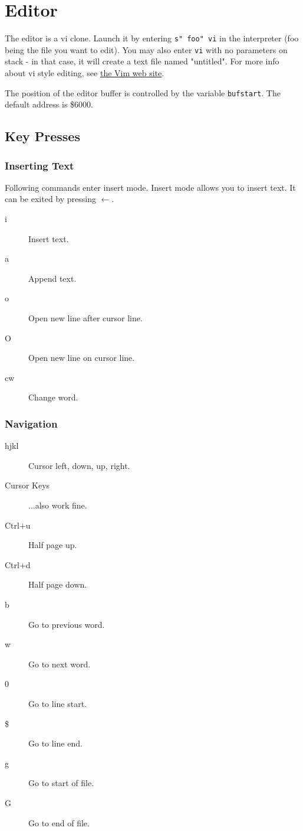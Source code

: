 \chapter{Editor} \label{editor}

The editor is a vi clone. Launch it by entering \texttt{s" foo" vi} in the interpreter (foo being
the file you want to edit). You may also enter \texttt{vi} with no parameters on stack - in
that case, it will create a text file named "untitled". For more info about vi style editing, see \href{http://www.vim.org}{the Vim web site}.

The position of the editor buffer is controlled by the variable \texttt{bufstart}. The default address is \$6000.

\section{Key Presses}

\subsection{Inserting Text}
Following commands enter insert mode. Insert mode allows you to insert text. It can be exited by pressing $\leftarrow$.
\begin{description}
\item[i] Insert text.
\item[a] Append text.
\item[o] Open new line after cursor line.
\item[O] Open new line on cursor line.
\item[cw] Change word.
\end{description}

\subsection{Navigation}
\begin{description}
\item[hjkl] Cursor left, down, up, right.
\item[Cursor Keys] ...also work fine.
\item[Ctrl+u] Half page up.
\item[Ctrl+d] Half page down.
\item[b] Go to previous word.
\item[w] Go to next word.
\item[0] Go to line start.
\item[\$] Go to line end.
\item[g] Go to start of file.
\item[G] Go to end of file.
\end{description}


